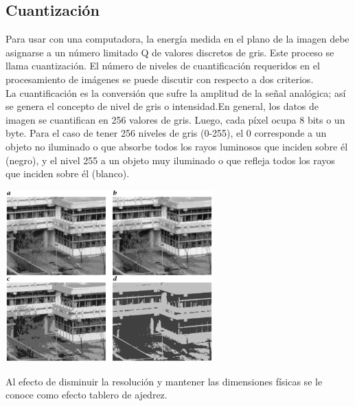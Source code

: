 \subsection{Cuantización}
Para usar con una computadora, la energía medida en el plano de la imagen debe
asignarse a un número limitado Q de valores discretos de gris. Este proceso se llama
cuantización. El número de niveles de cuantificación requeridos en el procesamiento de
imágenes se puede discutir con respecto a dos criterios.\cite{Book:Richard2011}\\
La cuantificación es la conversión
que sufre la amplitud de la señal analógica; así se genera el concepto de nivel de gris o
intensidad.En general, los datos de imagen se cuantifican en 256 valores de gris.
Luego, cada píxel ocupa 8 bits o un byte. Para el caso de tener 256 niveles de gris (0-255), el 0 corresponde a un
objeto no iluminado o que absorbe todos los rayos luminosos que inciden sobre él
(negro), y el nivel 255 a un objeto muy iluminado o que refleja todos los rayos que
inciden sobre él (blanco).
\begin{center}
	\includegraphics[width=0.6\textwidth]{Contenido/Cuerpo/Capitulo2/Fig9.eps}
	\label{fig:MarcoTeorico:Fig18}
\end{center}
Al efecto de disminuir la resolución y mantener las
dimensiones físicas se le conoce como efecto tablero de ajedrez.

